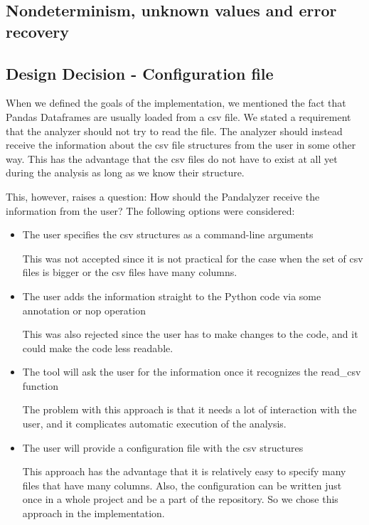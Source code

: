 \subsection{Nondeterminism, unknown values and error recovery}





\subsection{Design Decision - Configuration file}

When we defined the goals of the implementation, we mentioned the fact that Pandas Dataframes are usually loaded
from a csv file.
We stated a requirement that the analyzer should not try to read the file.
The analyzer should instead receive the information about the csv file structures from the user in some other way.
This has the advantage that the csv files do not have to exist at all yet during the analysis as long as we know their
structure.

This, however, raises a question: How should the Pandalyzer receive the information from the user?
The following options were considered:
\begin{itemize}
    \item The user specifies the csv structures as a command-line arguments

    This was not accepted since it is not practical for the case when the set of csv files is bigger or the csv files
    have many columns.

    \item The user adds the information straight to the Python code via some annotation or nop operation

    This was also rejected since the user has to make changes to the code, and it could make the code less readable.

    \item The tool will ask the user for the information once it recognizes the read\_csv function

    The problem with this approach is that it needs a lot of interaction with the user, and it complicates automatic
    execution of the analysis.

    \item The user will provide a configuration file with the csv structures

    This approach has the advantage that it is relatively easy to specify many files that have many columns.
    Also, the configuration can be written just once in a whole project and be a part of the repository.
    So we chose this approach in the implementation.
\end{itemize}


